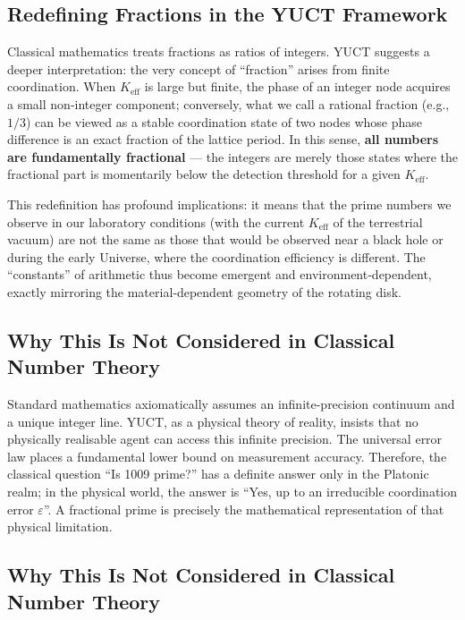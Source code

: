 \documentclass[12pt,a4paper]{article}
\theoremstyle{remark}
\begin{document}
	\subsection{Redefining Fractions in the YUCT Framework}
	
	Classical mathematics treats fractions as ratios of integers. YUCT suggests a deeper interpretation: the very concept of “fraction” arises from finite coordination. When \(K_{\mathrm{eff}}\) is large but finite, the phase of an integer node acquires a small non‑integer component; conversely, what we call a rational fraction (e.g., \(1/3\)) can be viewed as a stable coordination state of two nodes whose phase difference is an exact fraction of the lattice period. In this sense, \textbf{all numbers are fundamentally fractional} — the integers are merely those states where the fractional part is momentarily below the detection threshold for a given \(K_{\mathrm{eff}}\).
	
	This redefinition has profound implications: it means that the prime numbers we observe in our laboratory conditions (with the current \(K_{\mathrm{eff}}\) of the terrestrial vacuum) are not the same as those that would be observed near a black hole or during the early Universe, where the coordination efficiency is different. The “constants” of arithmetic thus become emergent and environment‑dependent, exactly mirroring the material‑dependent geometry of the rotating disk.
	
	\subsection{Why This Is Not Considered in Classical Number Theory}
	
	Standard mathematics axiomatically assumes an infinite-precision continuum and a unique integer line. YUCT, as a physical theory of reality, insists that no physically realisable agent can access this infinite precision. The universal error law places a fundamental lower bound on measurement accuracy. Therefore, the classical question “Is 1009 prime?” has a definite answer only in the Platonic realm; in the physical world, the answer is “Yes, up to an irreducible coordination error \(\varepsilon\)”. A fractional prime is precisely the mathematical representation of that physical limitation.
	
\subsection{Why This Is Not Considered in Classical Number Theory}
\end{document}
